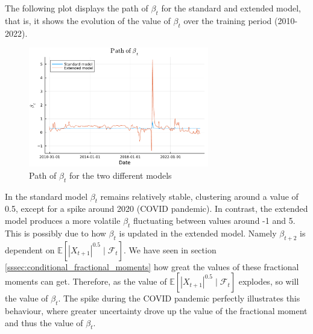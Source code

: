 The following plot displays the path of \(\beta_t\) for the standard and extended model, that is, it shows the evolution of the value of \(\beta_t\) over the training period (2010-2022).

\begin{figure}[H]
    \centering
    \includegraphics[width=0.7\textwidth]{figures/beta_path_alternative.pdf}
    \caption{Path of \(\beta_t\) for the two different models}
    \label{fig:beta_path}
\end{figure}
In the standard model \(\beta_t\) remains relatively stable, clustering around a value of 0.5, except for a spike around 2020 (COVID pandemic). In contrast, the extended model produces a more volatile \(\beta_t\) fluctuating between values around -1 and 5. This is possibly due to how \(\beta_t\) is updated in the extended model. Namely \(\beta_{t + 2}\) is dependent on \(\mathbb{E}[|X_{t + 1}|^{0.5} \mid \mathcal{F}_t]\). We have seen in section \ref{sssec:conditional_fractional_moments} how great the values of these fractional moments can get. Therefore, as the value of \(\mathbb{E}[|X_{t + 1}|^{0.5} \mid \mathcal{F}_t]\) explodes, so will the value of \(\beta_t\). The spike during the COVID pandemic perfectly illustrates this behaviour, where greater uncertainty drove up the value of the fractional moment and thus the value of \(\beta_t\).

